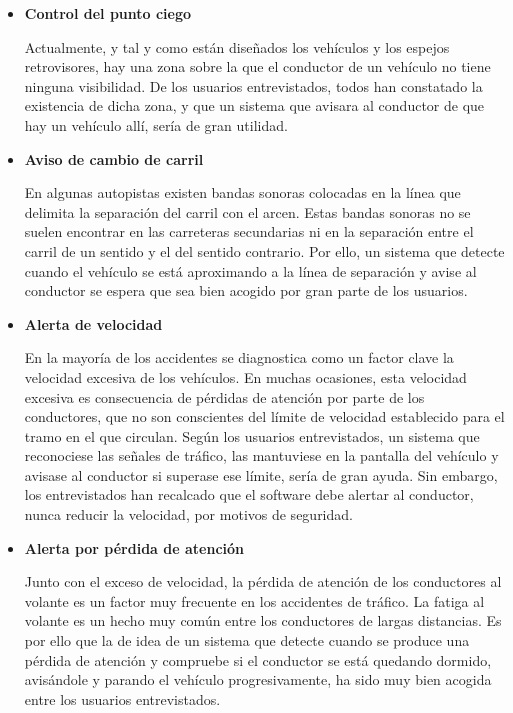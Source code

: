 \begin{itemize}[-]
\item \textbf{Control del punto ciego}
\par Actualmente, y tal y como están diseñados los vehículos y los espejos retrovisores, hay una zona sobre la que el conductor de un vehículo no tiene ninguna visibilidad. De los usuarios entrevistados, todos han constatado la existencia de dicha zona, y que un sistema que avisara al conductor de que hay un vehículo allí, sería de gran utilidad.

\item \textbf{Aviso de cambio de carril}
\par En algunas autopistas existen bandas sonoras colocadas en la línea que delimita la separación del carril con el arcen. Estas bandas sonoras no se suelen encontrar en las carreteras secundarias ni en la separación entre el carril de un sentido y el del sentido contrario.  Por ello, un sistema que detecte cuando el vehículo se está aproximando a la línea de separación y avise al conductor se espera que sea bien acogido por gran parte de los usuarios.

\item \textbf{Alerta de velocidad}
\par En la mayoría de los accidentes se diagnostica como un factor clave la velocidad excesiva de los vehículos. En muchas ocasiones, esta velocidad excesiva es consecuencia de pérdidas de atención por parte de los conductores, que no son conscientes del límite de velocidad establecido para el tramo en el que circulan. Según los usuarios entrevistados, un sistema que reconociese las señales de tráfico, las mantuviese en la pantalla del vehículo y avisase al conductor si superase ese límite, sería de gran ayuda. Sin embargo, los entrevistados han recalcado que el software debe alertar al conductor, nunca reducir la velocidad, por motivos de seguridad.

\item \textbf{Alerta por pérdida de atención}
\par Junto con el exceso de velocidad, la pérdida de atención de los conductores al volante es un factor muy frecuente en los accidentes de tráfico. La fatiga al volante es un hecho muy común entre los conductores de largas distancias. Es por ello que la de idea de un sistema que detecte cuando se produce una pérdida de atención y compruebe si el conductor se está quedando dormido, avisándole y parando el vehículo progresivamente, ha sido muy bien acogida entre los usuarios entrevistados.


\end{itemize}
